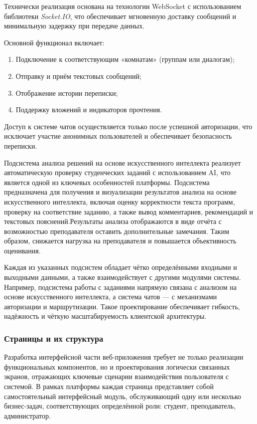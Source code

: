Технически реализация основана на технологии WebSocket с использованием библиотеки \textit{Socket.IO}, что обеспечивает мгновенную доставку сообщений и минимальную задержку при передаче данных.

Основной функционал включает:
\begin{enumerate}
\item Подключение к соответствующим «комнатам» (группам или диалогам);
\item Отправку и приём текстовых сообщений;
\item Отображение истории переписки;
\item Поддержку вложений и индикаторов прочтения.
\end{enumerate}

Доступ к системе чатов осуществляется только после успешной авторизации, что исключает участие анонимных пользователей и обеспечивает безопасность переписки.

Подсистема анализа решений на основе искусственного интеллекта реализует автоматическую проверку студенческих заданий с использованием AI, что является одной из ключевых особенностей платформы.
Подсистема предназначена для получения и визуализации результатов анализа на основе искусственного интеллекта, включая оценку корректности текста программ, проверку на соответствие заданию, а также вывод комментариев, рекомендаций и текстовых пояснений.Результаты анализа отображаются в виде отчёта с возможностью преподавателя оставить дополнительные замечания. Таким образом, снижается нагрузка на преподавателя и повышается объективность оценивания.

Каждая из указанных подсистем обладает чётко определёнными входными и выходными данными, а также взаимодействует с другими модулями системы. Например, подсистема работы с заданиями напрямую связана с анализом на основе искусственного интеллекта, а система чатов — с механизмами авторизации и маршрутизации. Такое проектирование обеспечивает гибкость, надёжность и чёткую масштабируемость клиентской архитектуры.

\subsubsection{Страницы и их структура}

Разработка интерфейсной части веб-приложения требует не только реализации функциональных компонентов, но и проектирования логически связанных экранов, отражающих ключевые сценарии взаимодействия пользователя с системой. В рамках платформы каждая страница представляет собой самостоятельный интерфейсный модуль, обслуживающий одну или несколько бизнес-задач, соответствующих определённой роли: студент, преподаватель, администратор.

